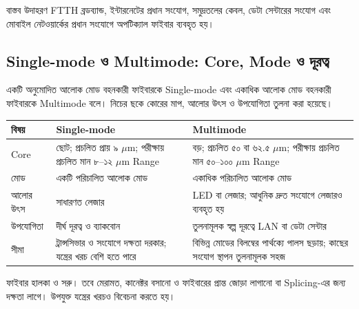 

\begin{examplebox}{বাস্তব উদাহরণ}
FTTH ব্রডব্যান্ড, ইন্টারনেটের প্রধান সংযোগ, সমুদ্রতলের কেবল, ডেটা সেন্টারের সংযোগ এবং মোবাইল নেটওয়ার্কের প্রধান সংযোগে অপটিক্যাল ফাইবার ব্যবহৃত হয়।
\end{examplebox}


\subsection{Single-mode ও Multimode: Core, Mode ও দূরত্ব}
একটি অনুমোদিত আলোক মোড বহনকারী ফাইবারকে Single-mode এবং একাধিক আলোক মোড বহনকারী ফাইবারকে Multimode বলে। নিচের ছকে কোরের মাপ, আলোর উৎস ও উপযোগিতা তুলনা করা হয়েছে।
\begin{tabularx}{\linewidth}{|p{.22\linewidth}|X|X|}
\hline
\textbf{বিষয়} & \textbf{Single-mode} & \textbf{Multimode}\\\hline
Core & ছোট; প্রচলিত প্রায় ৯ $\mu$m; পরীক্ষায় প্রচলিত মান ৮–১২ $\mu$m Range & বড়; প্রচলিত ৫০ বা ৬২.৫ $\mu$m; পরীক্ষায় প্রচলিত মান ৫০–১০০ $\mu$m Range\\\hline
মোড & একটি পরিচালিত আলোক মোড & একাধিক পরিচালিত আলোক মোড\\\hline
আলোর উৎস & সাধারণত লেজার & LED বা লেজার; আধুনিক দ্রুত সংযোগে লেজারও ব্যবহৃত হয়\\\hline
উপযোগিতা & দীর্ঘ দূরত্ব ও ব্যাকবোন & তুলনামূলক স্বল্প দূরত্বে LAN বা ডেটা সেন্টার\\\hline
সীমা & ট্রান্সসিভার ও সংযোগে দক্ষতা দরকার; যন্ত্রের খরচ বেশি হতে পারে & বিভিন্ন মোডের বিলম্বের পার্থক্যে পালস ছড়ায়; কাছের সংযোগ স্থাপন তুলনামূলক সহজ\\\hline
\end{tabularx}
ফাইবার হালকা ও সরু। তবে মেরামত, কানেক্টর বসানো ও ফাইবারের প্রান্ত জোড়া লাগানো বা Splicing-এর জন্য দক্ষতা লাগে। উপযুক্ত যন্ত্রের খরচও বিবেচনা করতে হয়।

